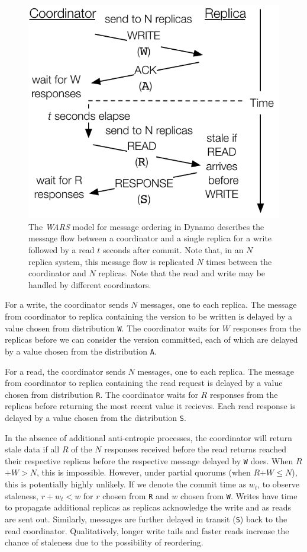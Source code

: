 \documentclass{vldb}
\begin{document}
\begin{figure}
\centering
\includegraphics[width=.8\columnwidth]{figs/dynamostale.pdf}
\caption{The \textit{WARS}  model for message ordering in Dynamo describes the
  message flow between a coordinator and a single replica for a write
  followed by a read $t$ seconds after commit.  Note that, in an $N$
  replica system, this message flow is replicated $N$ times between
  the coordinator and $N$ replicas.  Note that the read and write may be handled by different coordinators.}
\label{fig:dynamo-diagram}
\end{figure}

For a write, the coordinator sends $N$ messages, one to each
replica. The message from coordinator to replica containing the
version to be written is delayed by a value chosen from distribution
\texttt{W}.  The coordinator waits for $W$ responses from the replicas
before we can consider the version committed, each of which are delayed by
a value chosen from the distribution \texttt{A}.

For a read, the coordinator sends $N$ messages, one to each replica.
The message from coordinator to replica containing the read request is
delayed by a value chosen from distribution \texttt{R}.  The
coordinator waits for $R$ responses from the replicas before returning
the most recent value it recieves.  Each read response is delayed by a
value chosen from the distribution \texttt{S}.

In the absence of additional anti-entropic processes, the coordinator
will return stale data if all $R$ of the $N$ responses received before
the read returns reached their respective replicas before the
respective message delayed by \texttt{W} does.  When $R$$+$$W$$>$$N$,
this is impossible.  However, under partial quorums (when
$R$$+$$W$$\leq$$N$), this is potentially highly unlikely.  If we
denote the commit time as $w_t$, to observe staleness, $r+w_t < w$ for
$r$ chosen from \texttt{R} and $w$ chosen from \texttt{W}.  Writes
have time to propagate additional replicas as replicas acknowledge the
write and as reads are sent out.  Similarly, messages are further
delayed in transit (\texttt{S}) back to the read coordinator.
Qualitatively, longer write tails and faster reads increase the chance
of staleness due to the possibility of reordering.
\end{document}
